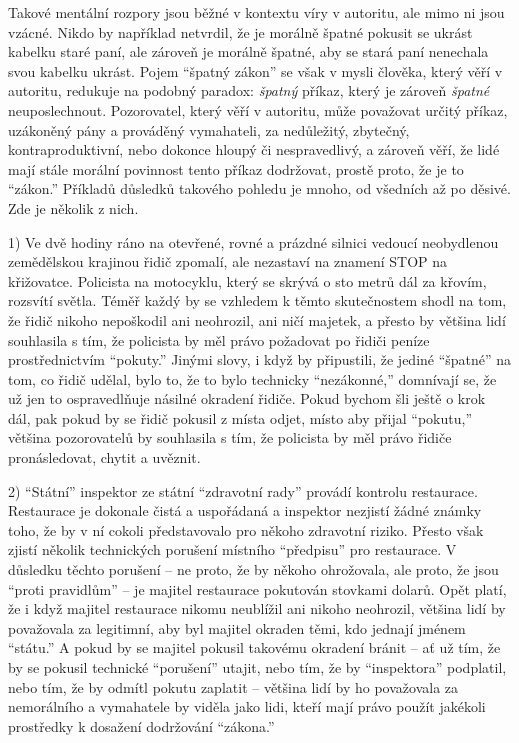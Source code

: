 \documentclass{book}
\begin{document}
Takové mentální rozpory jsou běžné v kontextu víry v autoritu, ale mimo ni jsou vzácné. Nikdo by například netvrdil, že je morálně špatné pokusit se ukrást kabelku staré paní, ale zároveň je morálně špatné, aby se stará paní nenechala svou kabelku ukrást. Pojem \enquote{špatný zákon} se však v mysli člověka, který věří v autoritu, redukuje na podobný paradox: \emph{špatný} příkaz, který je zároveň \emph{špatné} neuposlechnout. Pozorovatel, který věří v autoritu, může považovat určitý příkaz, uzákoněný pány a prováděný vymahateli, za nedůležitý, zbytečný, kontraproduktivní, nebo dokonce hloupý či nespravedlivý, a zároveň věří, že lidé mají stále morální povinnost tento příkaz dodržovat, prostě proto, že je to \enquote{zákon.} Příkladů důsledků takového pohledu je mnoho, od všedních až po děsivé. Zde je několik z nich.

1) Ve dvě hodiny ráno na otevřené, rovné a prázdné silnici vedoucí neobydlenou zemědělskou krajinou řidič zpomalí, ale nezastaví na znamení STOP na křižovatce. Policista na motocyklu, který se skrývá o sto metrů dál za křovím, rozsvítí světla. Téměř každý by se vzhledem k těmto skutečnostem shodl na tom, že řidič nikoho nepoškodil ani neohrozil, ani ničí majetek, a přesto by většina lidí souhlasila s tím, že policista by měl právo požadovat po řidiči peníze prostřednictvím \enquote{pokuty.} Jinými slovy, i když by připustili, že jediné \enquote{špatné} na tom, co řidič udělal, bylo to, že to bylo technicky \enquote{nezákonné,} domnívají se, že už jen to ospravedlňuje násilné okradení řidiče. Pokud bychom šli ještě o krok dál, pak pokud by se řidič pokusil z místa odjet, místo aby přijal \enquote{pokutu,} většina pozorovatelů by souhlasila s tím, že policista by měl právo řidiče pronásledovat, chytit a uvěznit.

2) \enquote{Státní} inspektor ze státní \enquote{zdravotní rady} provádí kontrolu restaurace. Restaurace je dokonale čistá a uspořádaná a inspektor nezjistí žádné známky toho, že by v ní cokoli představovalo pro někoho zdravotní riziko. Přesto však zjistí několik technických porušení místního \enquote{předpisu} pro restaurace. V důsledku těchto porušení -- ne proto, že by někoho ohrožovala, ale proto, že jsou \enquote{proti pravidlům} -- je majitel restaurace pokutován stovkami dolarů. Opět platí, že i když majitel restaurace nikomu neublížil ani nikoho neohrozil, většina lidí by považovala za legitimní, aby byl majitel okraden těmi, kdo jednají jménem \enquote{státu.} A pokud by se majitel pokusil takovému okradení bránit -- ať už tím, že by se pokusil technické \enquote{porušení} utajit, nebo tím, že by \enquote{inspektora} podplatil, nebo tím, že by odmítl pokutu zaplatit -- většina lidí by ho považovala za nemorálního a vymahatele by viděla jako lidi, kteří mají právo použít jakékoli prostředky k dosažení dodržování \enquote{zákona.}
\end{document}
